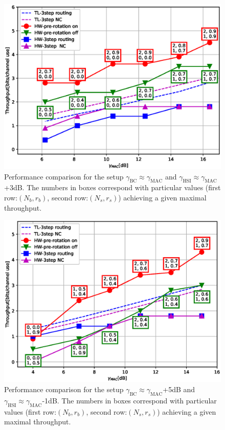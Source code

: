 \documentclass{article}
\begin{document}
\begin{figure}
\begin{centering}
\includegraphics[width=0.75\columnwidth]{fig/scheme_a}
\par\end{centering}
\centering{}\caption{Performance comparison for the setup
$\gamma_{\mathrm{BC}}\approx\gamma_{\mathrm{MAC}}$ and
$\gamma_{\mathrm{HSI}}\approx\gamma_{\mathrm{MAC}}$+3dB. The numbers in boxes correspond with 
particular values (first row:$(N_b, r_b)$, second row:$(N_s, r_s)$) 
achieving a given maximal throughput. 
\label{fig:CTUpp_comparison-schemaa}}
\end{figure}


\begin{figure}
\begin{centering}
\includegraphics[width=0.75\columnwidth]{fig/scheme_b}
\par\end{centering}
\centering{}\caption{Performance comparison for the setup
$\gamma_{\mathrm{BC}}\approx\gamma_{\mathrm{MAC}}$+5dB and
$\gamma_{\mathrm{HSI}}\approx\gamma_{\mathrm{MAC}}$-1dB.
The numbers in boxes correspond with 
particular values (first row:$(N_b, r_b)$, second row:$(N_s, r_s)$)
achieving a given maximal throughput.
\label{fig:CTUpp_comparison-schemab}}
\end{figure}
\end{document}
